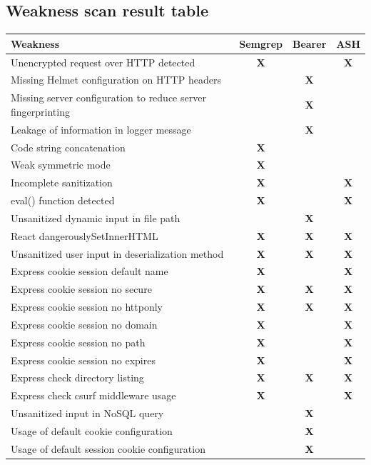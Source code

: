 \documentclass[]{article}
\newcommand{\cmark}{\textbf{X}} %
\begin{document}
\subsection{Weakness scan result table}
\begin{center}
\begin{tabular}{| m{10cm} | c | c | c |}
\hline
\textbf{Weakness} & \textbf{Semgrep} & \textbf{Bearer} & \textbf{ASH} \\ 
\hline
Unencrypted request over HTTP detected & \cmark & & \cmark \\ 
\hline
Missing Helmet configuration on HTTP headers & & \cmark & \\ 
\hline
Missing server configuration to reduce server fingerprinting & & \cmark & \\ 
\hline
Leakage of information in logger message & & \cmark & \\ 
\hline
Code string concatenation & \cmark & & \\ 
\hline
Weak symmetric mode & \cmark & & \\ 
\hline
Incomplete sanitization & \cmark & & \cmark \\ 
\hline
eval() function detected & \cmark & & \cmark \\ 
\hline
Unsanitized dynamic input in file path & & \cmark & \\ 
\hline
React dangerouslySetInnerHTML & \cmark & \cmark & \cmark \\ 
\hline
Unsanitized user input in deserialization method & \cmark & \cmark & \cmark \\ 
\hline
Express cookie session default name & \cmark & & \cmark \\ 
\hline
Express cookie session no secure & \cmark & \cmark & \cmark \\ 
\hline
Express cookie session no httponly & \cmark & \cmark & \cmark \\ 
\hline
Express cookie session no domain & \cmark & & \cmark \\ 
\hline
Express cookie session no path & \cmark & & \cmark \\ 
\hline
Express cookie session no expires & \cmark & & \cmark \\ 
\hline
Express check directory listing & \cmark & \cmark & \cmark \\ 
\hline
Express check csurf middleware usage & \cmark & & \cmark \\ 
\hline
Unsanitized input in NoSQL query & & \cmark & \\ 
\hline
Usage of default cookie configuration & & \cmark & \\ 
\hline
Usage of default session cookie configuration & & \cmark & \\ 
\hline
\end{tabular}
\end{center}
\end{document}
